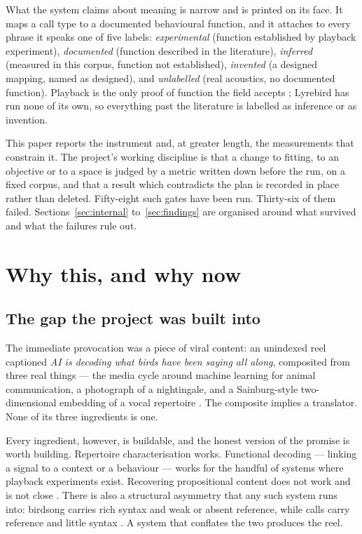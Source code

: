 \documentclass[10pt,twocolumn,a4paper]{article}
\begin{document}
What the system claims about meaning is narrow and is printed on its face. It maps a call
type to a documented behavioural function, and it attaches to every phrase it speaks one of
five labels: \emph{experimental} (function established by playback experiment),
\emph{documented} (function described in the literature), \emph{inferred} (measured in this
corpus, function not established), \emph{invented} (a designed mapping, named as designed),
and \emph{unlabelled} (real acoustics, no documented function). Playback is the only proof
of function the field accepts \citep{rutz2023}; Lyrebird has run none of its own, so
everything past the literature is labelled as inference or as invention.

This paper reports the instrument and, at greater length, the measurements that constrain
it. The project's working discipline is that a change to fitting, to an objective or to a
space is judged by a metric written down before the run, on a fixed corpus, and that a
result which contradicts the plan is recorded in place rather than deleted. Fifty-eight such
gates have been run. Thirty-six of them failed. Sections~\ref{sec:internal}
to~\ref{sec:findings} are organised around what survived and what the failures rule out.

\section{Why this, and why now}
\label{sec:why}

\subsection*{The gap the project was built into}

The immediate provocation was a piece of viral content: an unindexed reel captioned
\emph{AI is decoding what birds have been saying all along}, composited from three real
things --- the media cycle around machine learning for animal communication, a photograph
of a nightingale, and a Sainburg-style two-dimensional embedding of a vocal
repertoire \citep{sainburg2020}. The composite implies a translator. None of its three
ingredients is one.

Every ingredient, however, is buildable, and the honest version of the promise is worth
building. Repertoire characterisation works. Functional decoding --- linking a signal to a
context or a behaviour --- works for the handful of systems where playback experiments
exist. Recovering propositional content does not work and is not close
\citep{rutz2023}. There is also a structural asymmetry that any such system runs into:
birdsong carries rich syntax and weak or absent reference, while calls carry reference and
little syntax \citep{patelgrosz2023}. A system that conflates the two produces the reel.
\end{document}
